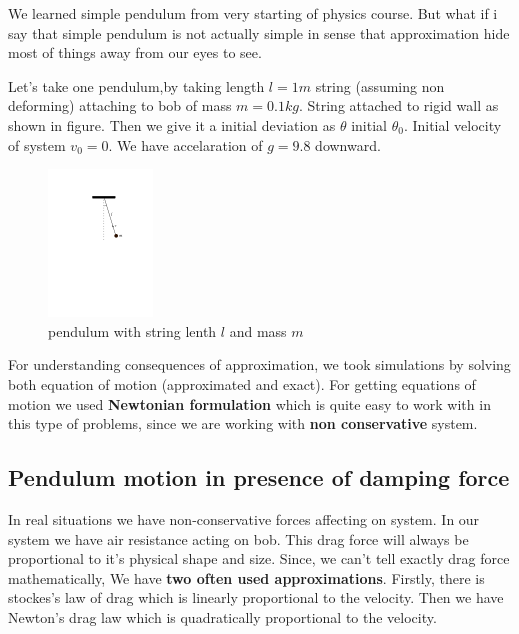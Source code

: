 \documentclass[11pt,a4paper]{article}
\begin{document}
We learned simple pendulum from very starting of physics course. But what if i say that simple pendulum is not actually simple in sense that approximation hide most of things away from our eyes to see.

Let's take one pendulum,by taking length \(l = 1 m\) string (assuming non deforming) attaching to bob of mass \(m = 0.1 kg\). String attached to rigid wall as shown in figure. Then we give it a initial deviation as \(\theta\) initial \(\theta_{0}\). Initial velocity of system \(v_{0}=0\). We have accelaration of \(g=9.8\) downward.

\begin{figure}[htbp]
\centering
\includegraphics[width=0.3 \textwidth]{./figure1.png}
\caption{\label{fig:orgcb8b6b3}pendulum with string lenth \(l\) and mass \(m\)}
\end{figure}

For understanding consequences of approximation, we took simulations by solving both equation of motion (approximated and exact). For getting equations of motion we used \textbf{Newtonian formulation} which is quite easy to work with in this type of problems, since we are working with \textbf{non conservative} system.


\subsection{Pendulum motion in presence of damping force}
\label{sec:orge2269db}

In real situations we have non-conservative forces affecting on system. In our system we have air resistance acting on bob. This drag force will always be proportional to it's physical shape and size. Since, we can't tell exactly drag force mathematically, We have \textbf{two often used approximations}. Firstly, there is stockes's law of drag which is linearly proportional to the velocity. Then we have Newton's drag law which is quadratically proportional to the velocity.
\end{document}
